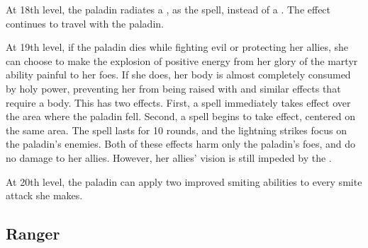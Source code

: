  At 18th level, the paladin radiates a , as the spell, instead of a . The effect continues to travel with the paladin.

 At 19th level, if the paladin dies while fighting evil or protecting her allies, she can choose to make the explosion of positive energy from her glory of the martyr ability painful to her foes. If she does, her body is almost completely consumed by holy power, preventing her from being raised with  and similar effects that require a body. This has two effects. First, a  spell immediately takes effect over the area where the paladin fell. Second, a  spell begins to take effect, centered on the same area. The spell lasts for 10 rounds, and the lightning strikes focus on the paladin's enemies. Both of these effects harm only the paladin's foes, and do no damage to her allies. However, her allies' vision is still impeded by the .

 At 20th level, the paladin can apply two improved smiting abilities to every smite attack she makes.

\subsection{Ranger}

